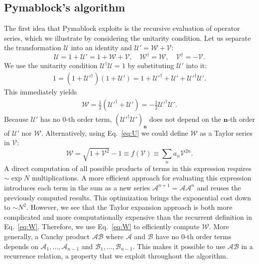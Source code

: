 \subsection{Pymablock's algorithm}
\label{sec:pymablock_algorithm}

The first idea that Pymablock exploits is the recursive evaluation of operator
series, which we illustrate by considering the unitarity condition.
Let us separate the transformation $\mathcal{U}$ into an identity and
$\mathcal{U}' = \mathcal{W} + \mathcal{V}$:
%
\begin{equation}
\label{eq:U}
\mathcal{U} = 1 + \mathcal{U}' = 1 + \mathcal{W} + \mathcal{V},\quad \mathcal{W}^\dagger = \mathcal{W},\quad \mathcal{V}^\dagger = -\mathcal{V}.
\end{equation}
%
We use the unitarity condition $\mathcal{U}^\dagger \mathcal{U} = 1$ by
substituting $\mathcal{U}'$ into it:
%
\begin{gather}
\label{eq:unitarity}
  1 = (1 + \mathcal{U}'^\dagger)(1+\mathcal{U}') = 1 + \mathcal{U}'^\dagger + \mathcal{U}' + \mathcal{U}'^\dagger \mathcal{U}'.
\end{gather}
%
This immediately yields
\begin{gather}
\label{eq:W}
\mathcal{W} = \frac{1}{2}(\mathcal{U}'^\dagger + \mathcal{U}') = -\frac{1}{2} \mathcal{U}'^\dagger \mathcal{U}'.
\end{gather}
%
Because $\mathcal{U}'$ has no $0$-th order term, $(\mathcal{U}'^\dagger
\mathcal{U}')_\mathbf{n}$ does not depend on the $\mathbf{n}$-th order of
$\mathcal{U}'$ nor $\mathcal{W}$.
Alternatively, using Eq.~\eqref{eq:U} we could define $\mathcal{W}$ as a Taylor
series in $\mathcal{V}$:
%
$$
\mathcal{W} = \sqrt{1 + \mathcal{V}^2} - 1 \equiv f(\mathcal{V}) \equiv \sum_n a_n \mathcal{V}^{2n}.
$$
%
A direct computation of all possible products of terms in this expression
requires $\sim \exp N$ multiplications.
A more efficient approach for evaluating this expression introduces each term
in the sum as a new series $\mathcal{A}^{n+1} = \mathcal{A}\mathcal{A}^{n}$ and
reuses the previously computed results.
This optimization brings the exponential cost down to $\sim N^2$.
However, we see that the Taylor expansion approach is both more complicated and more
computationally expensive than the recurrent definition in Eq.~\eqref{eq:W}.
Therefore, we use Eq.~\eqref{eq:W} to efficiently compute $\mathcal{W}$.
More generally, a Cauchy product $\mathcal{A}\mathcal{B}$ where $\mathcal{A}$
and $\mathcal{B}$ have no $0$-th order terms depends on $\mathcal{A}_1, \ldots,
\mathcal{A}_{n-1}$ and $\mathcal{B}_1, \ldots, \mathcal{B}_{n-1}$.
This makes it possible to use $\mathcal{AB}$ in a recurrence relation, a
property that we exploit throughout the algorithm.

